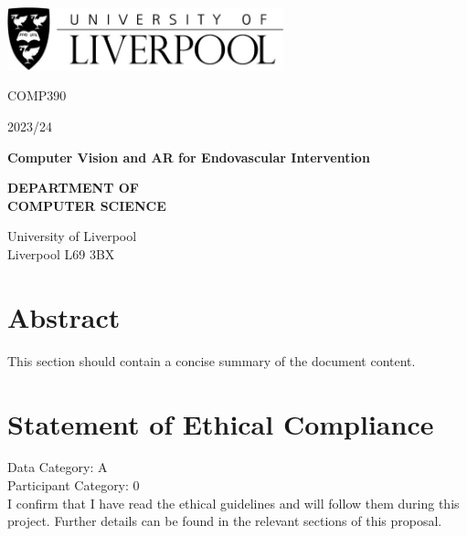 \documentclass[12pt]{article}
\begin{document}
\newpage
\begin{titlepage}
    \centering


    \includegraphics[width=0.6\textwidth]{Liverpool.jpg} %
    \vspace*{1cm}

    \Large
    COMP390

    \large
    2023/24

    \vspace{4.5cm}
    \Huge
    \textbf{Computer Vision and AR for Endovascular Intervention}

    \vspace{1.5cm}



    \vspace{4cm} %
    \Large
    \textbf{DEPARTMENT OF}\\
    \vspace{0.1cm} %
    \textbf{COMPUTER SCIENCE}

    \vspace{1cm} %
    \large
    University of Liverpool\\
    Liverpool L69 3BX


\end{titlepage}
\tableofcontents
\newpage

\section*{Abstract}
This section should contain a concise summary of the document content.

\section*{Statement of Ethical Compliance}
\begin{mdframed}
    \Large %
    Data Category: A \\
    Participant Category: 0 \\

    \normalsize %
    I confirm that I have read the ethical guidelines and will follow them during this project. Further details can be found in the relevant sections of this proposal.
\end{mdframed}
\newpage
\end{document}
